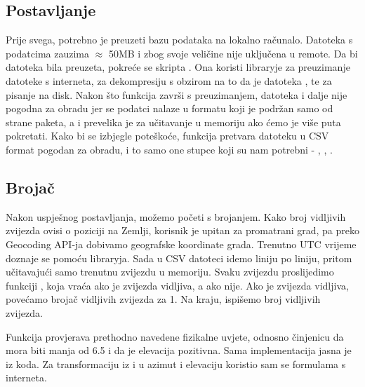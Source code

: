 \subsection{Postavljanje}
Prije svega, potrebno je preuzeti bazu podataka na lokalno računalo. Datoteka s podatcima zauzima $\approx$ 50MB i zbog svoje veličine nije uključena u remote.
Da bi datoteka bila preuzeta, pokreće se skripta . Ona koristi libraryje  za preuzimanje datoteke s interneta,  za dekompresiju s obzirom na to da je datoteka , te  za pisanje na disk. Nakon što funkcija  završi s preuzimanjem, datoteka  i dalje nije pogodna za obradu jer se podatci nalaze u formatu koji je podržan samo od strane  paketa, a i prevelika je za učitavanje u memoriju ako ćemo je više puta pokretati. Kako bi se izbjegle poteškoće, funkcija  pretvara datoteku u CSV format pogodan za obradu, i to samo one stupce koji su nam potrebni - , , .

\subsection{Brojač}
Nakon uspješnog postavljanja, možemo početi s brojanjem.
Kako broj vidljivih zvijezda ovisi o poziciji na Zemlji, korisnik je upitan za promatrani grad, pa preko Geocoding API-ja dobivamo geografske koordinate grada. Trenutno UTC vrijeme doznaje se pomoću  libraryja.
Sada u CSV datoteci idemo liniju po liniju, pritom učitavajući samo trenutnu zvijezdu u memoriju. Svaku zvijezdu proslijedimo funkciji , koja vraća  ako je zvijezda vidljiva, a  ako nije. Ako je zvijezda vidljiva, povećamo brojač vidljivih zvijezda za 1. Na kraju, ispišemo broj vidljivih zvijezda.

Funkcija  provjerava prethodno navedene fizikalne uvjete, odnosno činjenicu da  mora biti manja od 6.5 i da je elevacija pozitivna. Sama implementacija jasna je iz koda. Za transformaciju iz  i  u azimut i elevaciju koristio sam se formulama s interneta. \cite{ct:transform}

